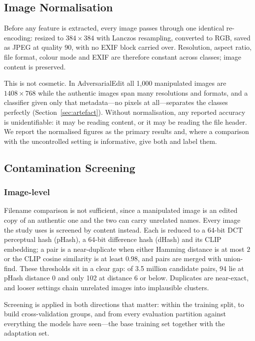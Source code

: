 \documentclass[journal]{IEEEtran}
\begin{document}
\subsection{Image Normalisation}
\label{sec:normalise}

Before any feature is extracted, every image passes through one identical
re-encoding: resized to $384 \times 384$ with Lanczos resampling, converted to
RGB, saved as JPEG at quality 90, with no EXIF block carried over. Resolution,
aspect ratio, file format, colour mode and EXIF are therefore constant across
classes; image content is preserved.

This is not cosmetic. In AdversarialEdit all 1{,}000 manipulated images are
$1408 \times 768$ while the authentic images span many resolutions and formats,
and a classifier given only that metadata---no pixels at all---separates the
classes perfectly (Section~\ref{sec:artefact}). Without normalisation, any
reported accuracy is unidentifiable: it may be reading content, or it may be
reading the file header. We report the normalised figures as the primary
results and, where a comparison with the uncontrolled setting is informative,
give both and label them.

\subsection{Contamination Screening}
\label{sec:dedup}

\subsubsection{Image-level}
Filename comparison is not sufficient, since a manipulated image is an edited
copy of an authentic one and the two can carry unrelated names. Every image the
study uses is screened by content instead. Each is reduced to a 64-bit DCT
perceptual hash (pHash), a 64-bit difference hash (dHash) and its CLIP
embedding; a pair is a near-duplicate when either Hamming distance is at most
$2$ or the CLIP cosine similarity is at least $0.98$, and pairs are merged with
union-find. These thresholds sit in a clear gap: of 3.5 million candidate
pairs, 94 lie at pHash distance $0$ and only 102 at distance $6$ or below.
Duplicates are near-exact, and looser settings chain unrelated images into
implausible clusters.

Screening is applied in both directions that matter: within the training split,
to build cross-validation groups, and from every evaluation partition against
everything the models have seen---the base training set together with the
adaptation set.
\end{document}
